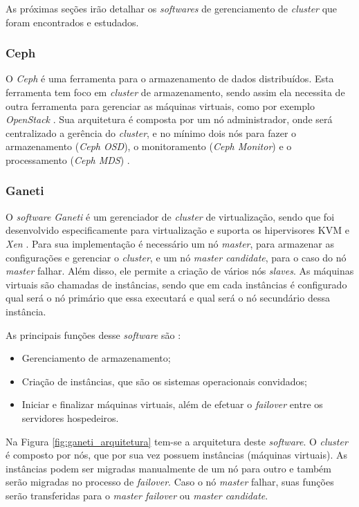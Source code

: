 As próximas seções irão detalhar os \textit{softwares} de gerenciamento de \textit{cluster} que foram encontrados e estudados.

\subsubsection{Ceph}
\label{section:ceph}
O \textit{Ceph} \cite{ceph} é uma ferramenta para o armazenamento de dados distribuídos. Esta ferramenta tem foco em \textit{cluster} 
de armazenamento, sendo assim ela necessita de outra ferramenta para gerenciar as máquinas virtuais, como por exemplo \textit{OpenStack} 
\cite{openstack}. Sua arquitetura é composta por um nó administrador, onde será centralizado a gerência do \textit{cluster}, e no mínimo dois 
nós para fazer o armazenamento (\textit{Ceph OSD}), o monitoramento (\textit{Ceph Monitor}) e o processamento (\textit{Ceph MDS}) \cite{ceph}.

\subsubsection{Ganeti}
\label{section:ganeti}
O \textit{software} \textit{Ganeti} \cite{ganeti} é um gerenciador de \textit{cluster} de virtualização, sendo que foi desenvolvido 
especificamente para virtualização e suporta os hipervisores \ac{KVM} \cite{kvm} e \textit{Xen} \cite{xen}. Para sua implementação é necessário
um nó \textit{master}, para armazenar as configurações e gerenciar o \textit{cluster}, e um nó \textit{master candidate}, para o caso do 
nó \textit{master} falhar. Além disso, ele permite a criação de vários nós \textit{slaves}. As máquinas virtuais são chamadas de instâncias, 
sendo que em cada instâncias é configurado qual será o nó primário que essa executará e qual será o nó secundário dessa instância.

As principais funções desse \textit{software} são \cite{ganeti}:
\begin{itemize}
 \item Gerenciamento de armazenamento;
 \item Criação de instâncias, que são os sistemas operacionais convidados;
 \item Iniciar e finalizar máquinas virtuais, além de efetuar o \textit{failover} entre os servidores hospedeiros.
\end{itemize}

Na Figura \ref{fig:ganeti_arquitetura} tem-se a arquitetura deste \textit{software}. O \textit{cluster} é composto por nós, que por sua vez 
possuem instâncias (máquinas virtuais). As instâncias podem ser migradas manualmente de um nó para outro e também serão migradas no processo de
\textit{failover}. Caso o nó \textit{master} falhar, suas funções serão transferidas para o \textit{master failover} ou \textit{master candidate}.

